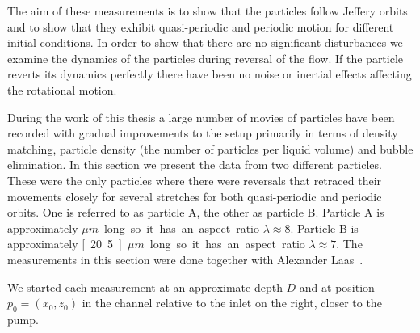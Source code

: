 The aim of these measurements is to show that the particles follow Jeffery orbits and to show that they exhibit quasi-periodic and periodic motion for different initial conditions. In order to show that there are no significant disturbances we examine the dynamics of the particles during reversal of the flow. If the particle reverts its dynamics perfectly there have been no noise or inertial effects affecting the rotational motion.

During the work of this thesis a large number of movies of particles have been recorded with gradual improvements to the setup primarily in terms of density matching, particle density (the number of particles per liquid volume) and  bubble elimination. In this section we present the data from two different particles. These were the only particles where there were reversals that retraced their movements closely for several stretches for both quasi-periodic and periodic orbits. One is referred to as particle A, the other as particle B. Particle A is approximately \unit[24]{$\mu m$} long so it has an aspect ratio $\lambda \approx 8$. Particle B is approximately \unit[20.5]{$\mu m$} long so it has an aspect ratio $\lambda \approx 7$. The measurements in this section were done together with Alexander Laas~\cite{alexanderThesis}.

We started each measurement at an approximate depth $D$ and at position $p_0 = (x_0, z_0)$ in the channel relative to the inlet on the right, closer to the pump. 

\newpage